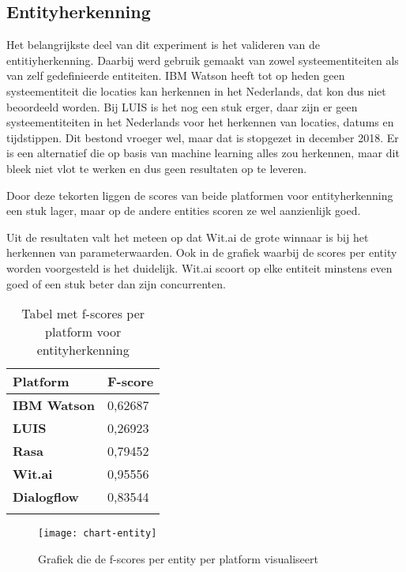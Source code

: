 \subsection{Entityherkenning}

Het belangrijkste deel van dit experiment is het valideren van de entitiyherkenning. Daarbij werd gebruik gemaakt van zowel systeementiteiten als van zelf gedefinieerde entiteiten. IBM Watson heeft tot op heden geen systeementiteit die locaties kan herkennen in het Nederlands, dat kon dus niet beoordeeld worden. Bij LUIS is het nog een stuk erger, daar zijn er geen systeementiteiten in het Nederlands voor het herkennen van locaties, datums en tijdstippen. Dit bestond vroeger wel, maar dat is stopgezet in december 2018. Er is een alternatief die op basis van machine learning alles zou herkennen, maar dit bleek niet vlot te werken en dus geen resultaten op te leveren.

Door deze tekorten liggen de scores van beide platformen voor entityherkenning een stuk lager, maar op de andere entities scoren ze wel aanzienlijk goed. 

Uit de resultaten valt het meteen op dat Wit.ai de grote winnaar is bij het herkennen van parameterwaarden. Ook in de grafiek waarbij de scores per entity worden voorgesteld is het duidelijk. Wit.ai scoort op elke entiteit minstens even goed of een stuk beter dan zijn concurrenten.

\begin{center}
    \begin{longtable}{| l | l |}
        \hline
        \textbf{Platform} & \textbf{F-score} \\ \hline
        \textbf{IBM Watson} & 0,62687 \\ \hline  
        \textbf{LUIS} & 0,26923 \\ \hline  
        \textbf{Rasa} & 0,79452 \\ \hline  
        \textbf{Wit.ai} & 0,95556  \\ \hline  
        \textbf{Dialogflow} & 0,83544 \\ \hline  
        \caption{Tabel met f-scores per platform voor entityherkenning}                                    
    \end{longtable}
    \label{tbl:results-entity}
\end{center}

\begin{figure}[H]
    \label{fig:chart-entity}
    \centering
    \texttt{[image: chart-entity]}
    \caption{Grafiek die de f-scores per entity per platform visualiseert}
\end{figure}

